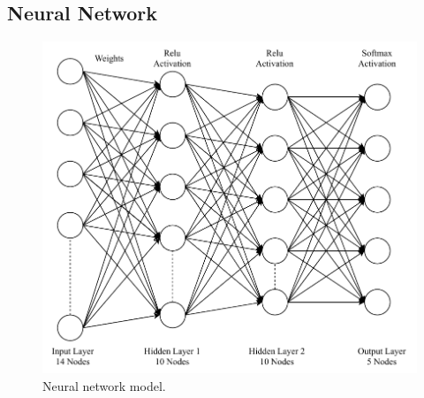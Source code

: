     
    
    \subsection{Neural Network} \label{SSNN}
    \begin{figure}[h]
    \center	
    \includegraphics[scale=0.9]{Figures/PDF/NN.pdf}	
    \caption{Neural network model.}
    \label{NN}	
    \end{figure}
    
